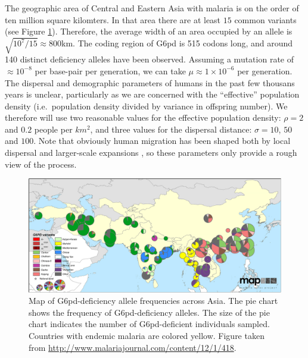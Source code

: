 \documentclass{article}
\begin{document}
The geographic area of Central and Eastern Asia with malaria is 
on the order of ten million square kilomters.
In that area there are at least $15$ common variants \citep{Howes-g6pd-variants} (see Figure \ref{fig-G6PD-map}). 
Therefore, the average width of an area occupied by an allele is $\sqrt{10^7/15} \approx  800$km. 
The coding region of G6pd is 515 codons long, 
and around 140 distinct deficiency alleles have been observed. 
Assuming a mutation rate of $\approx 10^{-8}$ per base-pair per generation, 
we can take $\mu \approx 1 \times 10^{-6}$ per generation. 
The dispersal and demographic parameters of humans in the past few thousans years is unclear,
particularly as we are concerned with the ``effective'' population density
(i.e.\ population density divided by variance in offspring number).
We therefore will use two reasonable values for the effective population density: $\rho=2$ and $0.2$ people per $km^2$,
and three values for the dispersal distance: $\sigma=10$, $50$ and $100$.
Note that obviously human migration has been shaped both by local dispersal and larger-scale expansions 
\citep[see ][for a recent discussion]{}, 
so these parameters only provide a rough view of the process.

\begin{figure}[ht]
\begin{center}
  \includegraphics[width=1.0\textwidth]{G6pd_Howes_et_al_1475-2875-12-418-4}   %
\caption{ 
Map of G6pd-deficiency allele frequencies across Asia. 
The pie chart shows the frequency of G6pd-deficiency alleles. 
The size of the pie chart indicates the number of G6pd-deficient individuals sampled.
Countries with endemic malaria are colored yellow. 
Figure taken from \citet{Howes-g6pd-variants}
\url{http://www.malariajournal.com/content/12/1/418}. 
} \label{fig-G6PD-map}
\end{center}
\end{figure}
\end{document}
